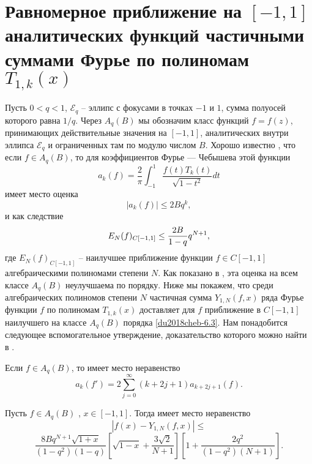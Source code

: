 \section{Равномерное приближение на $[-1,1]$ аналитических функций частичными суммами Фурье по полиномам $T_{1,k}(x)$}
Пусть $0<q<1$, $\mathcal{E}_q$ -- эллипс с фокусами в точках
$-1$ и $1$, сумма полуосей которого равна $1/q$.
Через $A_q(B)$ мы обозначим класс функций $f=f(z)$,
принимающих действительные значения на $[-1,1]$, аналитических
внутри эллипса $\mathcal{E}_q$ и ограниченных там по модулю числом
$B$. Хорошо известно \cite{Timan}, что если
$f\in A_q(B)$, то для коэффициентов Фурье --- Чебышева этой функции
\begin{equation}\label{du2018cheb-6.1}
a_k(f)=\frac{2}{\pi}\int_{-1}^{1}\frac{f(t)T_k(t)}{\sqrt{1-t^2}}dt
\end{equation}
имеет место оценка
\begin{equation}\label{du2018cheb-6.2}
|a_k(f)|\le2Bq^k,
\end{equation}
и как следствие
\begin{equation}\label{du2018cheb-6.3}
E_N(f)_{C[-1,1]}\le{2B\over1-q}q^{N+1},
\end{equation}
где $E_N(f)_{C[-1,1]}$ -- наилучшее приближение функции $f\in C[-1,1]$ алгебраическими полиномами степени $N$. Как показано в \cite{du2018cheb-Ahiezer}, эта оценка на всем классе  $A_q(B)$ неулучшаема по порядку.  Ниже мы  покажем, что среди алгебраических полиномов степени $N$ частичная сумма $Y_{1,N}(f,x)$ ряда Фурье функции $f$ по полиномам $T_{1,k}(x)$    доставляет для $f$ приближение в $C[-1,1]$ наилучшего на классе $A_q(B)$ порядка \eqref{du2018cheb-6.3}. Нам понадобится следующее    вспомогательное утверждение, доказательство которого можно найти  в \cite{Pash}.
\begin{lemma}\label{du2018cheb-lemC} Если $f\in A_q(B)$, то имеет место неравенство
	$$
	a_k(f')=2\sum_{j=0}^\infty(k+2j+1)a_{k+2j+1}(f).
	$$
\end{lemma}

\begin{theorem} \label{du2018cheb-th4}    Пусть  $f\in A_q(B)$ , $x\in[-1,1]$. Тогда имеет  место неравенство
	$$
	|f(x)- Y_{1,N}(f,x)|\le
	$$
	$$
	\frac{8Bq^{N+1}\sqrt{1+x}}{(1-q^2)(1-q)}\left[\sqrt{1-x}+\frac{3\sqrt{2}}{N+1}\right]\left[1+
	\frac{2q^2}{(1-q^2)(N+1)}\right].
	$$
\end{theorem}



